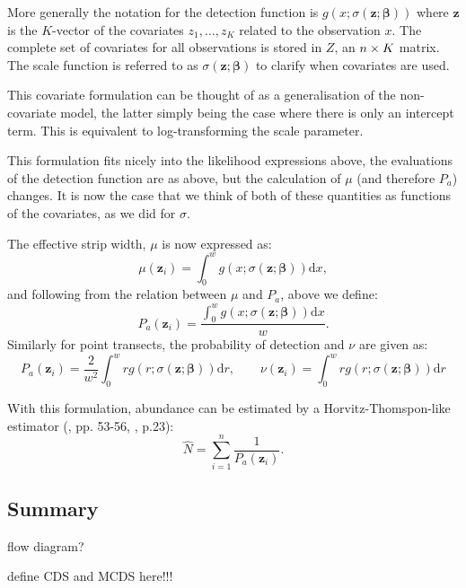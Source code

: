 More generally the notation for the detection function is $g(x ; \sigma(\bm{z}; \bm{\beta}))$ where $\bm{z}$ is the $K$-vector of the covariates $z_1, \dots, z_K$ related to the observation $x$. The complete set of covariates for all observations is stored in $Z$, an $n \times K$ matrix. The scale function is referred to as $\sigma(\bm{z}; \bm{\beta})$ to clarify when covariates are used.

This covariate formulation can be thought of as a generalisation of the non-covariate model, the latter simply being the case where there is only an intercept term. This is equivalent to log-transforming the scale parameter.

This formulation fits nicely into the likelihood expressions above, the evaluations of the detection function are as above, but the calculation of $\mu$ (and therefore $P_a$) changes. It is now the case that we think of both of these quantities as functions of the covariates, as we did for $\sigma$.

The effective strip width, $\mu$ is now expressed as:
\begin{equation}
\mu(\bm{z}_i) = \int_0^w g(x ; \sigma(\bm{z}; \bm{\beta})) \text{d}x,
\end{equation}
and following from the relation between $\mu$ and $P_a$, above we define:
\begin{equation}
P_a(\bm{z}_i) = \frac{\int_0^w g(x ; \sigma(\bm{z}; \bm{\beta})) \text{d}x}{w}.
\end{equation}
Similarly for point transects, the probability of detection and $\nu$ are given as:
\begin{equation}
P_a(\bm{z}_i) =\frac{2}{w^2}\int_0^w r g(r; \sigma(\bm{z}; \bm{\beta})) \text{d}r, \qquad \nu(\bm{z}_i) = \int_0^w r g(r; \sigma(\bm{z}; \bm{\beta})) \text{d}r
\end{equation}

With this formulation, abundance can be estimated by a Horvitz-Thomspon-like estimator (\cite{thompson}, pp. 53-56, \cite{ADS}, p.23):
\begin{equation}
\hat{N} = \sum_{i=1}^n \frac{1}{P_a(\bm{z}_i)}.
\end{equation}

\subsection{Summary}

flow diagram?

define CDS and MCDS here!!!


